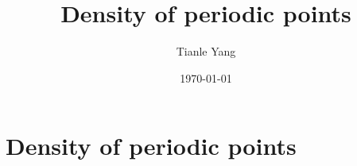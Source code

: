 \documentclass[sectionlevel=section,status=draft]{noteformyself}
\title{Density of periodic points}
\author{Tianle Yang}
\date{\today}
\begin{document}
    \maketitle

    \section[
      status=draft,
      tag=00000,
      label=\labelNFM{sec:periodic-points-and-orbits:density-of-periodic-points-for-cohomologically-hyperbolic-maps}
    ]{Density of periodic points}

    

\end{document}
